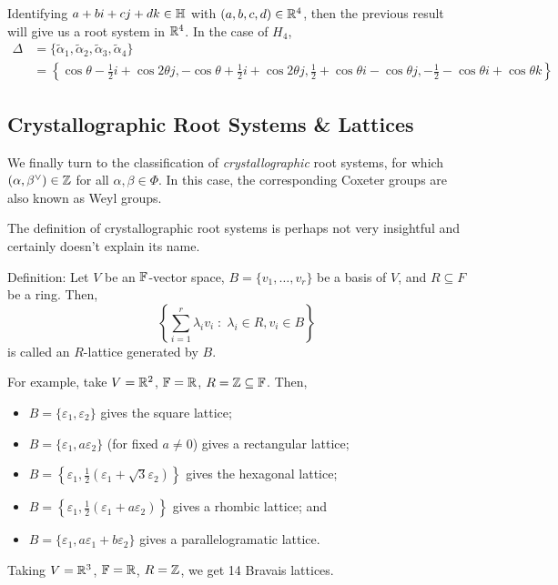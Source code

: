 Identifying $a+bi+cj+dk \in \mathbb{H}$ with $(a,b,c,d) \in \mathbb{R}^4$, then the previous
result will give us a root system in $\mathbb{R}^4$. In the case of $H_4$,
\begin{align*}
    \Delta &= \{\tilde{\alpha}_1, \tilde{\alpha}_2, \tilde{\alpha}_3, \tilde{\alpha}_4\} \\
    &= \left\{
        \cos \theta - \frac{1}{2} i + \cos 2\theta j,
        -\cos \theta + \frac{1}{2} i + \cos 2\theta j,
        \frac{1}{2} + \cos \theta i - \cos \theta j,
        -\frac{1}{2} - \cos \theta i + \cos \theta k
    \right\}
\end{align*}

\subsection{Crystallographic Root Systems \& Lattices}

We finally turn to the classification of {\em crystallographic} root systems,
for which $(\alpha, \beta^\vee) \in \mathbb{Z}$ for all $\alpha, \beta \in \Phi$.
In this case, the corresponding Coxeter groups are also known as Weyl groups.

The definition of crystallographic root systems is perhaps not very insightful
and certainly doesn't explain its name.

Definition: Let $V$ be an $\mathbb{F}$-vector space, $B = \{v_1, \dots, v_r\}$ be a
basis of $V$, and $R \subseteq F$ be a ring. Then,
\[
    \left\{ \sum_{i=1}^{r} \lambda_i v_i \; : \; \lambda_i \in R, v_i \in B\right\}
\]
is called an $R$-lattice generated by $B$.

\newpage

For example, take $V = \mathbb{R}^2$, $\mathbb{F} = \mathbb{R}$, $R = \mathbb{Z} \subseteq \mathbb{F}$. Then,
\begin{itemize}
\item
$B = \{\varepsilon_1, \varepsilon_2\}$ gives the square lattice;
\item
$B = \{\varepsilon_1, a\varepsilon_2\}$ (for fixed $a \neq 0$) gives a
rectangular lattice;
\item
$B = \left\{\varepsilon_1, \frac{1}{2}(\varepsilon_1 + \sqrt{3} \varepsilon_2)\right\}$
gives the hexagonal lattice;
\item
$B = \left\{\varepsilon_1, \frac{1}{2} (\varepsilon_1 + a\varepsilon_2) \right\}$
gives a rhombic lattice; and
\item
$B = \{\varepsilon_1, a\varepsilon_1 + b\varepsilon_2\}$
gives a parallelogramatic lattice.
\end{itemize}
Taking $V = \mathbb{R}^3$, $\mathbb{F} = \mathbb{R}$, $R = \mathbb{Z}$, we get 14 Bravais lattices.

